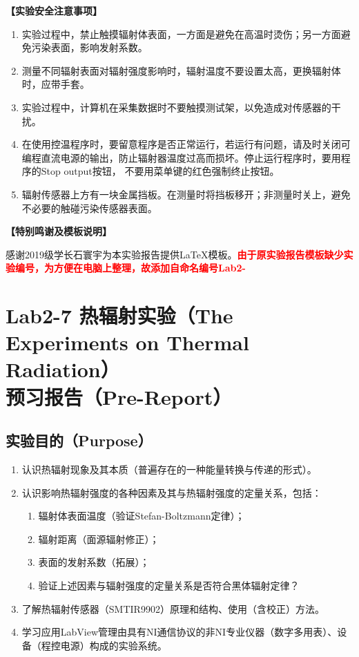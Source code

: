 \documentclass[dvipsnames, svgnames,a4paper,11pt]{article}
\begin{document}
	\textbf{【实验安全注意事项】}	
	\begin{enumerate}
		\item 实验过程中，禁止触摸辐射体表面，一方面是避免在高温时烫伤；另一方面避免污染表面，影响发射系数。
		\item 测量不同辐射表面对辐射强度影响时，辐射温度不要设置太高，更换辐射体时，应带手套。
		\item 实验过程中，计算机在采集数据时不要触摸测试架，以免造成对传感器的干扰。
		\item 在使用控温程序时，要留意程序是否正常运行，若运行有问题，请及时关闭可编程直流电源的输出，防止辐射器温度过高而损坏。停止运行程序时，要用程序的Stop output按钮， 不要用菜单键的红色强制终止按钮。
		\item 辐射传感器上方有一块金属挡板。在测量时将挡板移开；非测量时关上，避免不必要的触碰污染传感器表面。
	\end{enumerate}
	
	
	\textbf{【特别鸣谢及模板说明】}	
	
	感谢2019级学长石寰宇为本实验报告提供\LaTeX 模板。\textcolor{red}{\textbf{由于原实验报告模板缺少实验编号，为方便在电脑上整理，故添加自命名编号Lab2-}}
	
	
	
	\clearpage
	\tableofcontents
	\clearpage
	
	
	
	
	\setcounter{section}{0}
	\section{Lab2-7 热辐射实验（The Experiments on Thermal Radiation）\\ \quad\heiti 预习报告（Pre-Report）}
	
	\subsection{实验目的（Purpose）}
	\begin{enumerate}
		\item 认识热辐射现象及其本质（普遍存在的一种能量转换与传递的形式）。
		\item 认识影响热辐射强度的各种因素及其与热辐射强度的定量关系，包括：
		
		\begin{enumerate}
			\item 辐射体表面温度（验证Stefan-Boltzmann定律）；
			\item 辐射距离（面源辐射修正）；
			\item 表面的发射系数（拓展）；
			\item 验证上述因素与辐射强度的定量关系是否符合黑体辐射定律？
		\end{enumerate}
		
		\item 了解热辐射传感器（SMTIR9902）原理和结构、使用（含校正）方法。
		\item 学习应用LabView管理由具有NI通信协议的非NI专业仪器（数字多用表）、设备（程控电源）构成的实验系统。
	\end{enumerate}
	
\end{document}
